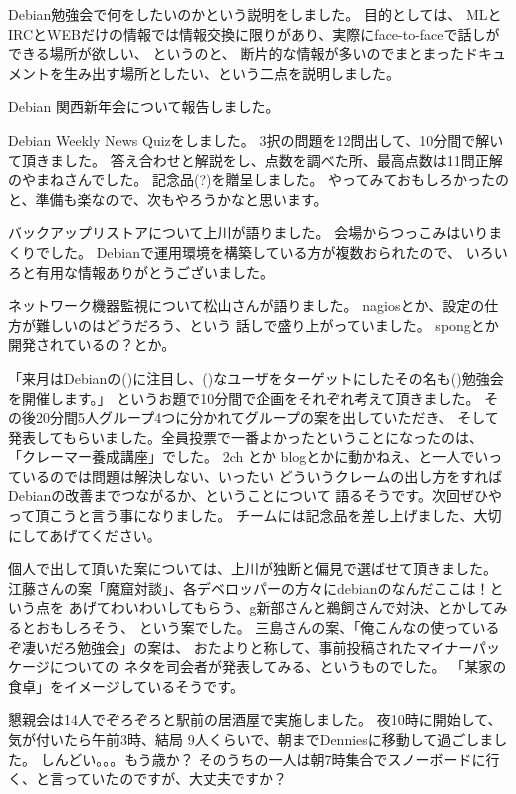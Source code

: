 \documentclass[mingoth]{jsarticle}
\begin{document}
	    Debian勉強会で何をしたいのかという説明をしました。
	    目的としては、
	    MLとIRCとWEBだけの情報では情報交換に限りがあり、実際にface-to-faceで話しができる場所が欲しい、
	    というのと、
	    断片的な情報が多いのでまとまったドキュメントを生み出す場所としたい、という二点を説明しました。

	    Debian 関西新年会について報告しました。

	    Debian Weekly News Quizをしました。
	    3択の問題を12問出して、10分間で解いて頂きました。
	    答え合わせと解説をし、点数を調べた所、最高点数は11問正解のやまねさんでした。
	    記念品(?)を贈呈しました。
	    やってみておもしろかったのと、準備も楽なので、次もやろうかなと思います。

	    バックアップリストアについて上川が語りました。
	    会場からつっこみはいりまくりでした。
	    Debianで運用環境を構築している方が複数おられたので、
	    いろいろと有用な情報ありがとうございました。

	    ネットワーク機器監視について松山さんが語りました。
	    nagiosとか、設定の仕方が難しいのはどうだろう、という
	    話しで盛り上がっていました。
	    spongとか開発されているの？とか。


	    「来月はDebianの()に注目し、()なユーザをターゲットにしたその名も()勉強会を開催します。」
	    というお題で10分間で企画をそれぞれ考えて頂きました。
	    その後20分間5人グループ4つに分かれてグループの案を出していただき、
	    そして発表してもらいました。全員投票で一番よかったということになったのは、
	    「クレーマー養成講座」でした。
	    2ch とか blogとかに動かねえ、と一人でいっているのでは問題は解決しない、いったい
	    どういうクレームの出し方をすればDebianの改善までつながるか、ということについて
	    語るそうです。次回ぜひやって頂こうと言う事になりました。
	    チームには記念品を差し上げました、大切にしてあげてください。

	    個人で出して頂いた案については、上川が独断と偏見で選ばせて頂きました。
	    江藤さんの案「魔窟対談」、各デベロッパーの方々にdebianのなんだここは！という点を
	    あげてわいわいしてもらう、g新部さんと鵜飼さんで対決、とかしてみるとおもしろそう、
	    という案でした。
	    三島さんの案、「俺こんなの使っているぞ凄いだろ勉強会」の案は、
	    おたよりと称して、事前投稿されたマイナーパッケージについての
	    ネタを司会者が発表してみる、というものでした。
	    「某家の食卓」をイメージしているそうです。


	    懇親会は14人でぞろぞろと駅前の居酒屋で実施しました。
	    夜10時に開始して、気が付いたら午前3時、結局
	    9人くらいで、朝までDenniesに移動して過ごしました。
	    しんどい。。。もう歳か？
	    そのうちの一人は朝7時集合でスノーボードに行く、と言っていたのですが、大丈夫ですか？
\end{document}
